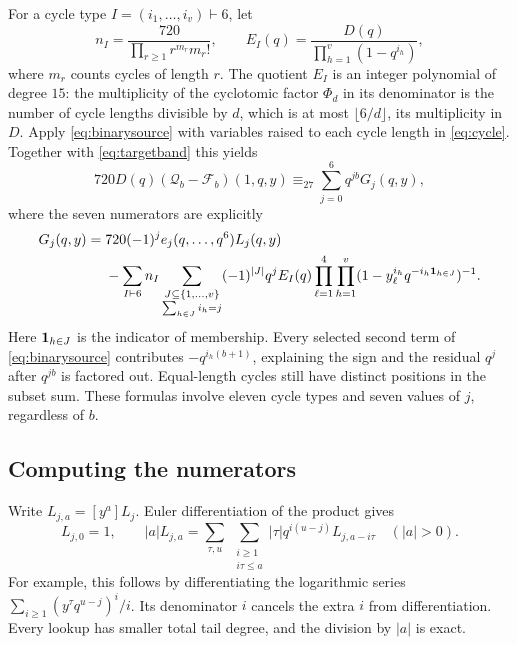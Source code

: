 For a cycle type \(I=(i_1,\ldots,i_v)\vdash6\), let
\[
 n_I=\frac{720}{\prod_{r\ge1}r^{m_r}m_r!},\qquad
 E_I(q)=\frac{D(q)}{\prod_{h=1}^v(1-q^{i_h})},
\]
where \(m_r\) counts cycles of length \(r\).
The quotient \(E_I\) is an integer polynomial of degree \(15\):
the multiplicity of the cyclotomic factor \(\Phi_d\) in its denominator
is the number of cycle lengths divisible by \(d\), which is at most
\(\lfloor6/d\rfloor\), its multiplicity in \(D\).
Apply \eqref{eq:binarysource} with variables raised to each cycle length
in \eqref{eq:cycle}. Together with \eqref{eq:targetband} this yields
\begin{equation}\label{eq:seven}
 720D(q)(\mathcal Q_b-\mathcal F_b)(1,q,y)
                         \equiv_{27}\sum_{j=0}^6q^{jb}G_j(q,y),
\end{equation}
where the seven numerators are explicitly
\begin{align}
G_j(q,y)={}&720(-1)^je_j(q,\ldots,q^6)L_j(q,y)\notag\\
 &-\sum_{I\vdash6}n_I
   \sum_{\substack{J\subseteq\{1,\ldots,v\}\\\sum_{h\in J}i_h=j}}
   (-1)^{|J|}q^j E_I(q)
   \prod_{\ell=1}^4\prod_{h=1}^v
       (1-y_\ell^{i_h}q^{-i_h\boldsymbol 1_{h\in J}})^{-1}.
                                                     \label{eq:G}
\end{align}
Here \(\boldsymbol 1_{h\in J}\) is the indicator of membership.
Every selected second term of \eqref{eq:binarysource} contributes
\(-q^{i_h(b+1)}\), explaining the sign and the residual \(q^j\)
after \(q^{jb}\) is factored out. Equal-length cycles still have distinct
positions in the subset sum. These formulas involve eleven cycle types
and seven values of \(j\), regardless of \(b\).

\subsection{Computing the numerators}
Write \(L_{j,a}=[y^a]L_j\). Euler differentiation of the product gives
\begin{equation}\label{eq:euler}
 L_{j,0}=1,\qquad
 |a|L_{j,a}=
 \sum_{\tau,u}\ \sum_{\substack{i\ge1\\i\tau\le a}}
              |\tau|q^{i(u-j)}L_{j,a-i\tau}\quad(|a|>0).
\end{equation}
For example, this follows by differentiating the logarithmic series
\(\sum_{i\ge1}(y^\tau q^{u-j})^i/i\). Its denominator \(i\) cancels
the extra \(i\) from differentiation. Every lookup has smaller total
tail degree, and the division by \(|a|\) is exact.

